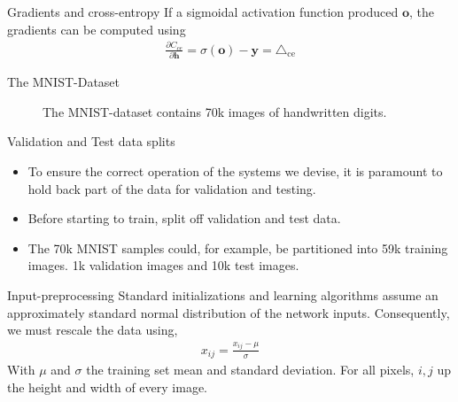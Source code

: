 \documentclass{beamer}
\begin{document}
    \begin{frame}{Gradients and cross-entropy}
      If a sigmoidal activation function produced $\mathbf{o}$, the gradients can be computed using ~\cite{nielsen2015neural,bishop2006pattern}
      \begin{align} 
         \frac{\partial C_{ce}}{\partial \mathbf{h}} 
         = \sigma(\mathbf{o}) - \mathbf{y} = \triangle_{\text{ce}}
      \end{align}
    \end{frame}

    \begin{frame}{The MNIST-Dataset}
      \begin{figure}
        
        \caption{The MNIST-dataset contains 70k images of handwritten digits.}
      \end{figure}
    \end{frame}

    \begin{frame}{Validation and Test data splits}
      \begin{itemize}
        \item To ensure the correct operation of the systems we devise, it is paramount to 
        hold back part of the data for validation and testing.
        \item Before starting to train, split off validation and test data.
        \item The 70k MNIST samples could, for example, be partitioned into 59k training images.
        1k validation images and 10k test images. 
      \end{itemize}
    \end{frame}

    \begin{frame}{Input-preprocessing}
      Standard initializations and learning algorithms assume an approximately standard normal distribution
      of the network inputs. Consequently, we must rescale the data using,
      \begin{align}
        {x}_{ij} = \frac{x_{ij} - \mu}{\sigma}
      \end{align}
      With $\mu$ and $\sigma$ the training set mean and standard deviation.
      For all pixels, $i,j$ up the height and width of every image.
    \end{frame}
\end{document}
